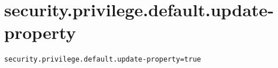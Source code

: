 \section{security.privilege.default.update-property}
\label{configuration:SecurityPrivilegeDefaultUpdateProperty}
\AvailableInJavaOnly{\TODO}
\begin{lstlisting}[style=Props,caption={Usage example for \textit{security.privilege.default.update-property}}]
security.privilege.default.update-property=true
\end{lstlisting}